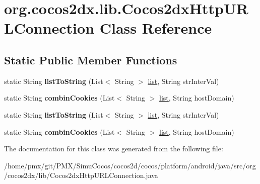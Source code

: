 \hypertarget{classorg_1_1cocos2dx_1_1lib_1_1Cocos2dxHttpURLConnection}{}\section{org.\+cocos2dx.\+lib.\+Cocos2dx\+Http\+U\+R\+L\+Connection Class Reference}
\label{classorg_1_1cocos2dx_1_1lib_1_1Cocos2dxHttpURLConnection}
\subsection*{Static Public Member Functions}
\begin{DoxyCompactItemize}
\item 
\mbox{\label{classorg_1_1cocos2dx_1_1lib_1_1Cocos2dxHttpURLConnection_a81821b2ccdc6506248d82fc936f7b806}} 
static String {\bfseries list\+To\+String} (List$<$ String $>$ \hyperlink{protocollist-p}{list}, String str\+Inter\+Val)
\item 
\mbox{\label{classorg_1_1cocos2dx_1_1lib_1_1Cocos2dxHttpURLConnection_a969c81d751920cb0419abdb3bdd1e26e}} 
static String {\bfseries combin\+Cookies} (List$<$ String $>$ \hyperlink{protocollist-p}{list}, String host\+Domain)
\item 
\mbox{\label{classorg_1_1cocos2dx_1_1lib_1_1Cocos2dxHttpURLConnection_a81821b2ccdc6506248d82fc936f7b806}} 
static String {\bfseries list\+To\+String} (List$<$ String $>$ \hyperlink{protocollist-p}{list}, String str\+Inter\+Val)
\item 
\mbox{\label{classorg_1_1cocos2dx_1_1lib_1_1Cocos2dxHttpURLConnection_a969c81d751920cb0419abdb3bdd1e26e}} 
static String {\bfseries combin\+Cookies} (List$<$ String $>$ \hyperlink{protocollist-p}{list}, String host\+Domain)
\end{DoxyCompactItemize}


The documentation for this class was generated from the following file\+:\begin{DoxyCompactItemize}
\item 
/home/pmx/git/\+P\+M\+X/\+Simu\+Cocos/cocos2d/cocos/platform/android/java/src/org/cocos2dx/lib/Cocos2dx\+Http\+U\+R\+L\+Connection.\+java\end{DoxyCompactItemize}
